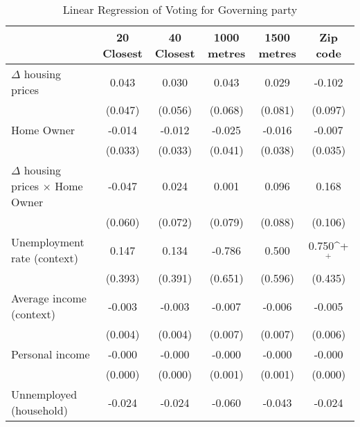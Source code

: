 \begin{table}[htbp]\centering
\def\sym#1{\ifmmode^{#1}\else\(^{#1}\)\fi}
\caption{Linear Regression of Voting for Governing party } \footnotesize \label{home}
\begin{tabular}{l*{5}{c}}
\hline\hline
                    &\multicolumn{1}{c}{20 Closest}&\multicolumn{1}{c}{40 Closest}&\multicolumn{1}{c}{1000 metres}&\multicolumn{1}{c}{1500 metres}&\multicolumn{1}{c}{Zip code}\\
\hline
$\Delta$ housing prices&       0.043       &       0.030       &       0.043       &       0.029       &      -0.102       \\
                    &     (0.047)       &     (0.056)       &     (0.068)       &     (0.081)       &     (0.097)       \\
[1em]
Home Owner          &      -0.014       &      -0.012       &      -0.025       &      -0.016       &      -0.007       \\
                    &     (0.033)       &     (0.033)       &     (0.041)       &     (0.038)       &     (0.035)       \\
[1em]
$\Delta$ housing prices $\times$ Home Owner&      -0.047       &       0.024       &       0.001       &       0.096       &       0.168       \\
                    &     (0.060)       &     (0.072)       &     (0.079)       &     (0.088)       &     (0.106)       \\
[1em]
Unemployment rate (context)&       0.147       &       0.134       &      -0.786       &       0.500       &       0.750\sym{+}\\
                    &     (0.393)       &     (0.391)       &     (0.651)       &     (0.596)       &     (0.435)       \\
[1em]
Average income (context)&      -0.003       &      -0.003       &      -0.007       &      -0.006       &      -0.005       \\
                    &     (0.004)       &     (0.004)       &     (0.007)       &     (0.007)       &     (0.006)       \\
[1em]
Personal income     &      -0.000       &      -0.000       &      -0.000       &      -0.000       &      -0.000       \\
                    &     (0.000)       &     (0.000)       &     (0.001)       &     (0.001)       &     (0.000)       \\
[1em]
Unnemployed (household)&      -0.024       &      -0.024       &      -0.060       &      -0.043       &      -0.024       \\

\end{tabular}
\end{table}
